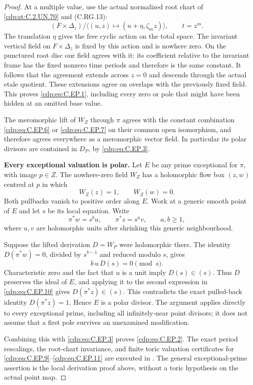 \begin{proof}
At a multiple value, use the actual normalized
root chart of \ref{cdp:st:C.2.UN.70} and (C.RG.13):
\[
 (F\times\Delta_z)/\langle
       (u,z)\longmapsto(u+\eta,\zeta_mz)\rangle,
       \qquad t=z^m .
 \tag{C.EP.8}\label{cdp:eq:C.EP.8}
\]
The translation \(\eta\) gives the free cyclic
action on the total space. The invariant
vertical field on \(F\times\Delta_z\) is fixed
by this action and is nowhere zero. On the
punctured root disc our field agrees with it:
its coefficient relative to the invariant
frame has the fixed nonzero time periods and
therefore is the same constant. It follows
that the agreement extends across \(z=0\)
and descends through the actual etale quotient.
These extensions agree on overlaps with the
previously fixed field. This proves \eqref{cdp:eq:C.EP.1},
including every zero or pole that might have
been hidden at an omitted base value.

The meromorphic lift of \(W_Z\) through \(\pi\)
agrees with the constant combination \eqref{cdp:eq:C.EP.6}
or \eqref{cdp:eq:C.EP.7} on their common open isomorphism,
and therefore agrees everywhere as a
meromorphic vector field. In particular its
polar divisors are contained in \(D_P\), by
\eqref{cdp:eq:C.EP.3}.

\par\medskip\noindent\textbf{Every exceptional valuation is polar.}
Let \(E\) be any prime exceptional for \(\pi\),
with image \(p\in Z\). The nowhere-zero field
\(W_Z\) has a holomorphic flow box \((z,w)\)
centred at \(p\) in which
\[
                   W_Z(z)=1,\qquad W_Z(w)=0.
 \tag{C.EP.9}\label{cdp:eq:C.EP.9}
\]
Both pullbacks vanish to positive order along
\(E\). Work at a generic smooth point of \(E\)
and let \(s\) be its local equation. Write
\[
            \pi^*w=s^b u,\qquad
            \pi^*z=s^a v,\qquad a,b\ge1,
 \tag{C.EP.10}\label{cdp:eq:C.EP.10}
\]
where \(u,v\) are holomorphic units after
shrinking this generic neighbourhood.

Suppose the lifted derivation \(D=W_P\) were
holomorphic there. The identity
\(D(\pi^*w)=0\), divided by \(s^{b-1}\) and
reduced modulo \(s\), gives
\[
                    b\,u\,D(s)=0\pmod{s}.
 \tag{C.EP.11}\label{cdp:eq:C.EP.11}
\]
Characteristic zero and the fact that \(u\)
is a unit imply \(D(s)\in(s)\). Thus \(D\)
preserves the ideal of \(E\), and applying it
to the second expression in \eqref{cdp:eq:C.EP.10} gives
\(D(\pi^*z)\in(s)\). This contradicts the
exact pulled-back identity \(D(\pi^*z)=1\).
Hence \(E\) is a polar divisor. The argument
applies directly to every exceptional prime,
including all infinitely-near point divisors;
it does not assume that a first pole survives
an unexamined modification.

Combining this with \eqref{cdp:eq:C.EP.3} proves \eqref{cdp:eq:C.EP.2}.
The exact period rescalings, the root-chart
invariance, and finite toric valuation
certificates for \eqref{cdp:eq:C.EP.9}--\eqref{cdp:eq:C.EP.11} are
executed in .
The general exceptional-prime assertion is
the local derivation proof above, without a
toric hypothesis on the actual point map.
\end{proof}


